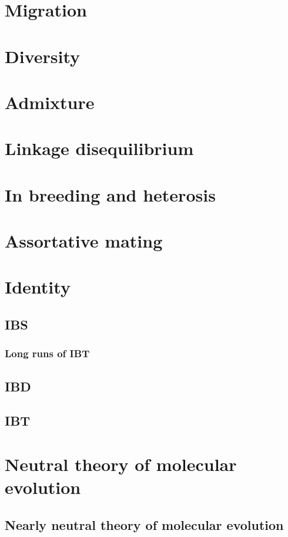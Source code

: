 \documentclass[]{book}
\theoremstyle{definition}
\theoremstyle{definition}
\theoremstyle{definition}
\theoremstyle{remark}
\begin{document}
\chapter{Migration}\label{migration}

\chapter{Diversity}\label{diversity}

\chapter{Admixture}\label{admixture}

\chapter{Linkage disequilibrium}\label{linkage-disequilibrium}

\chapter{In breeding and heterosis}\label{in-breeding-and-heterosis}

\chapter{Assortative mating}\label{assortative-mating}

\chapter{Identity}\label{identity}

\section{IBS}\label{ibs}

\subsection{Long runs of IBT}\label{long-runs-of-ibt}

\section{IBD}\label{ibd}

\section{IBT}\label{ibt}

\chapter{Neutral theory of molecular
evolution}\label{neutral-theory-of-molecular-evolution}

\section{Nearly neutral theory of molecular
evolution}\label{nearly-neutral-theory-of-molecular-evolution}
\end{document}
